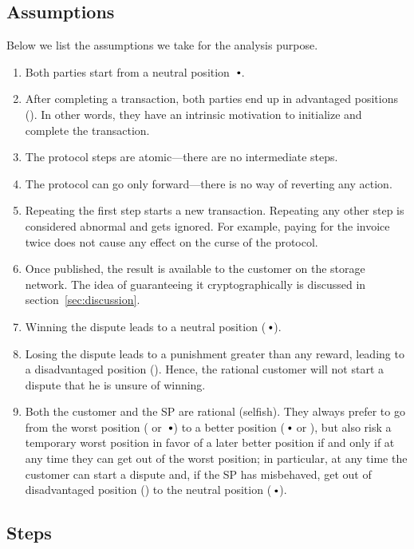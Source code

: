 \subsection{Assumptions}\label{sec:assumptions}

Below we list the assumptions we take for the analysis purpose.  

\begin{enumerate}
\item Both parties start from a neutral position $\neutral$.
\item After completing a transaction, both parties end up in advantaged positions (\plus{}). In other words, they have an intrinsic motivation to initialize and complete the transaction.
\item The protocol steps are atomic—there are no intermediate steps.
\item The protocol can go only forward—there is no way of reverting any action.
\item Repeating the first step starts a new transaction. Repeating any other step is considered abnormal and gets ignored. For example, paying for the invoice twice does not cause any effect on the curse of the protocol.
\item Once published, the result is available to the customer on the storage network. The idea of guaranteeing it cryptographically is discussed in section~\ref{sec:discussion}.
\item Winning the dispute leads to a neutral position ($\neutral$).
\item Losing the dispute leads to a punishment greater than any reward, leading to a disadvantaged position (\minus{}). Hence, the rational customer will not start a dispute that he is unsure of winning.
\item Both the customer and the SP are rational (selfish). They always prefer to go from the worst position (\minus{} or $\neutral${}) to a better position ($\neutral$ or \plus), but also risk a temporary worst position in favor of a later better position if and only if at any time they can get out of the worst position; in particular, at any time the customer can start a dispute and, if the SP has misbehaved, get out of disadvantaged position (\minus) to the neutral position ($\neutral$).
\end{enumerate}

\subsection{Steps}\label{sec:steps}

